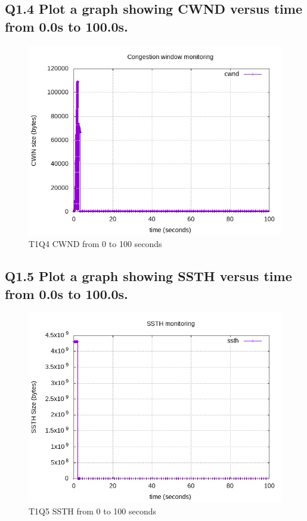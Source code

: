 \documentclass{article}
\begin{document}
\subsection{Q1.4 Plot a graph showing CWND versus time from 0.0s to 100.0s.}

\begin{figure}[H]
	\includegraphics{lab1-group1-task1-question4.png}
	\caption{T1Q4 CWND from 0 to 100 seconds}
\end{figure}


\subsection{Q1.5 Plot a graph showing SSTH versus time from 0.0s to 100.0s.}

\begin{figure}[H]
	\includegraphics{lab1-group1-task1-question5.png}
	\caption{T1Q5 SSTH from 0 to 100 seconds}
\end{figure}
\end{document}
